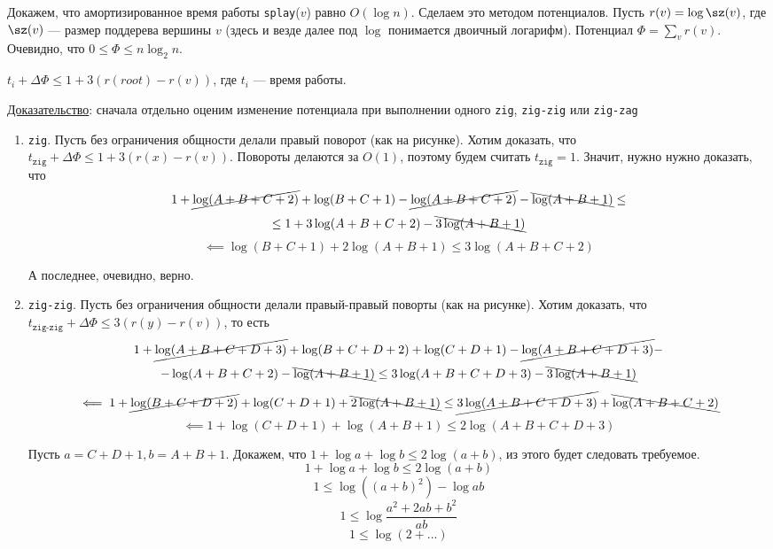 Докажем, что амортизированное время работы \texttt{splay}($v$) равно $O(\log n)$. Сделаем это методом потенциалов. Пусть $r(v) = \log \sz(v)$, где $\sz(v)$ --- размер поддерева вершины $v$ (здесь и везде далее под $\log$ понимается двоичный логарифм). Потенциал $\Phi = \sum\limits_{v} r(v)$. Очевидно, что $0 \leq \Phi \leq n \log_2 n$.

\begin{statement}
$t_i + \Delta \Phi \leq 1 + 3(r(root) - r(v))$, где $t_i$ --- время работы.
\end{statement}
\underline{Доказательство}: сначала отдельно оценим изменение потенциала при выполнении одного \texttt{zig}, \texttt{zig-zig} или \texttt{zig-zag}
\begin{enumerate}
    \item \texttt{zig}. Пусть без ограничения общности делали правый поворот (как на рисунке). Хотим доказать, что $t_\texttt{zig} + \Delta \Phi \leq 1 + 3(r(x) - r(v))$. Повороты делаются за $O(1)$, поэтому будем считать $t_\texttt{zig} = 1$. Значит, нужно нужно доказать, что 
    \[ 1 + \cancel{\log(A + B + C + 2)} + \log(B + C + 1) - \cancel{\log(A + B + C + 2)} - \bcancel{\log(A + B + 1)} \leq 
    \] \[ \leq 1 + 3 \log(A + B + C + 2) - \bcancel{3\log(A + B + 1)} \]
    \[ \impliedby \log(B + C + 1) + 2 \log(A + B + 1) \leq 3 \log(A + B + C + 2) \]


    А последнее, очевидно, верно.

    \item \texttt{zig-zig}. Пусть без ограничения общности делали правый-правый поворты (как на рисунке). Хотим доказать, что $t_\texttt{zig-zig} + \Delta \Phi \leq 3(r(y) - r(v))$, то есть
    \[ 1 + \cancel{\log(A + B + C + D + 3)} + \log(B + C + D + 2) + \log(C + D + 1) - \cancel{\log(A + B + C + D + 3)} - \]
    \[ -\log(A + B + C + 2) - \bcancel{\log(A + B + 1)} \leq 3\log(A + B + C + D + 3) - \bcancel{3\log(A + B + 1)} \]
    \[ \impliedby 1 + \cancel{\log(B + C + D + 2)} + \log(C + D + 1) + \bcancel{2 \log(A + B + 1)} \leq \cancel{3\log(A + B + C + D + 3)} + \bcancel{\log(A + B + C + 2)}\]
    \[ \impliedby 1 + \log(C + D + 1) + \log(A + B + 1) \leq 2\log(A + B + C + D + 3) \]

    Пусть $a = C + D + 1, b = A + B + 1$. Докажем, что $1 + \log a + \log b \leq 2\log (a + b)$, из этого будет следовать требуемое. 
    \[ 1 + \log a + \log b \leq 2 \log(a + b) \]
    \[ 1 \leq \log((a + b)^2) - \log ab \]
    \[ 1 \leq \log \frac{a^2 + 2ab + b^2}{ab} \]
    \[ 1 \leq \log (2 + ...) \]


\end{enumerate}
